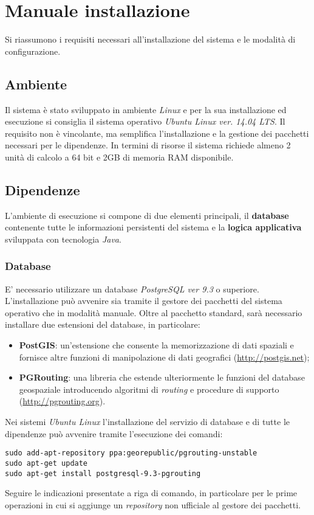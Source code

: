 \chapter{Manuale installazione}
Si riassumono i requisiti necessari all'installazione del sistema e le modalità di configurazione.

\section{Ambiente}
Il sistema è stato sviluppato in ambiente \emph{Linux} e per la sua installazione ed esecuzione si consiglia il sistema operativo \emph{Ubuntu Linux ver. 14.04 LTS}. Il requisito non è vincolante, ma semplifica l'installazione e la gestione dei pacchetti necessari per le dipendenze. In termini di risorse il sistema richiede almeno 2 unità di calcolo a 64 bit e 2GB di memoria RAM disponibile.

\section{Dipendenze}
L'ambiente di esecuzione si compone di due elementi principali, il \textbf{database} contenente tutte le informazioni persistenti del sistema e la \textbf{logica applicativa} sviluppata con tecnologia \emph{Java}.

\subsection{Database}
E' necessario utilizzare un database \emph{PostgreSQL ver 9.3} o superiore. L'installazione può avvenire sia tramite il gestore dei pacchetti del sistema operativo che in modalità manuale. Oltre al pacchetto standard, sarà necessario installare due estensioni del database, in particolare:
\begin{itemize}
\item \textbf{PostGIS}: un'estensione che consente la memorizzazione di dati spaziali e fornisce altre funzioni di manipolazione di dati geografici (\url{http://postgis.net});
\item \textbf{PGRouting}: una libreria che estende ulteriormente le funzioni del database geospaziale introducendo algoritmi di \emph{routing} e procedure di supporto (\url{http://pgrouting.org}).
\end{itemize}
Nei sistemi \emph{Ubuntu Linux} l'installazione del servizio di database e di tutte le dipendenze può avvenire tramite l'esecuzione dei comandi:
\begin{verbatim}
sudo add-apt-repository ppa:georepublic/pgrouting-unstable
sudo apt-get update
sudo apt-get install postgresql-9.3-pgrouting
\end{verbatim}
Seguire le indicazioni presentate a riga di comando, in particolare per le prime operazioni in cui si aggiunge un \emph{repository} non ufficiale al gestore dei pacchetti.

